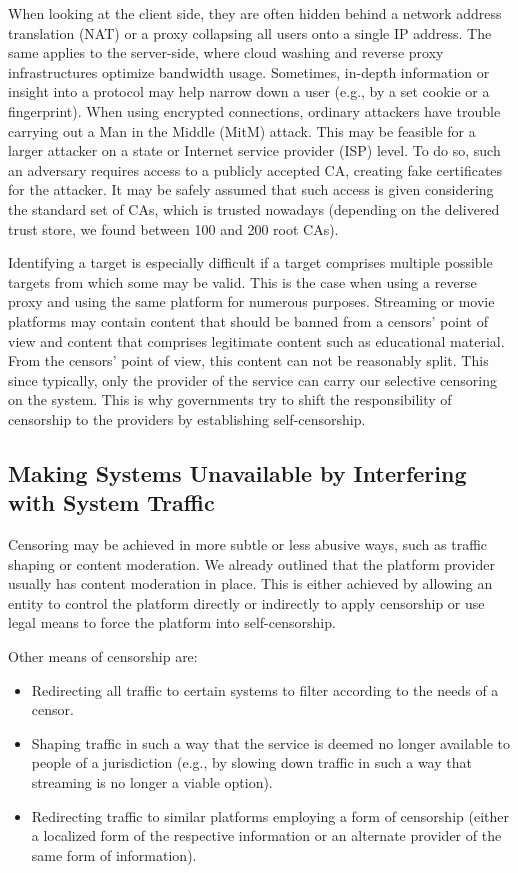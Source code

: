 When looking at the client side, they are often hidden behind a network address translation (NAT) or a proxy collapsing all users onto a single IP address. The same applies to the server-side, where cloud washing and reverse proxy infrastructures optimize bandwidth usage. Sometimes, in-depth information or insight into a protocol may help narrow down a user (e.g., by a set cookie or a fingerprint). When using encrypted connections, ordinary attackers have trouble carrying out a Man in the Middle (MitM) attack. This may be feasible for a larger attacker on a state or Internet service provider (ISP) level. To do so, such an adversary requires access to a publicly accepted CA, creating fake certificates for the attacker. It may be safely assumed that such access is given considering the standard set of CAs, which is trusted nowadays (depending on the delivered trust store, we found between 100 and 200 root CAs).

Identifying a target is especially difficult if a target comprises multiple possible targets from which some may be valid. This is the case when using a reverse proxy and using the same platform for numerous purposes. Streaming or movie platforms may contain content that should be banned from a censors' point of view and content that comprises legitimate content such as educational material. From the censors' point of view, this content can not be reasonably split. This since typically, only the provider of the service can carry our selective censoring on the system. This is why governments try to shift the responsibility of censorship to the providers by establishing self-censorship. 

\subsection{Making Systems Unavailable by Interfering with System Traffic}
Censoring may be achieved in more subtle or less abusive ways, such as traffic shaping or content moderation. We already outlined that the platform provider usually has content moderation in place. This is either achieved by allowing an entity to control the platform directly or indirectly to apply censorship or use legal means to force the platform into self-censorship.

Other means of censorship are:
\begin{itemize}
	\item Redirecting all traffic to certain systems to filter according to the needs of a censor.
	\item Shaping traffic in such a way that the service is deemed no longer available to people of a jurisdiction (e.g., by slowing down traffic in such a way that streaming is no longer a viable option).
	\item Redirecting traffic to similar platforms employing a form of censorship (either a localized form of the respective information or an alternate provider of the same form of information).
\end{itemize}

